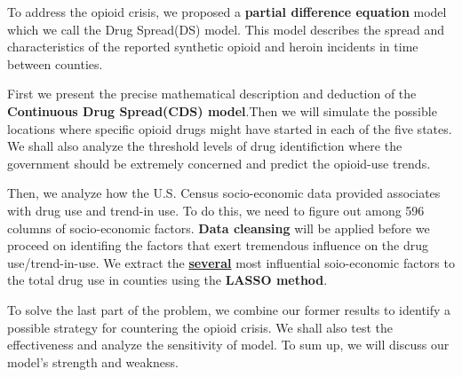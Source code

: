 To address the opioid crisis, we proposed a \textbf{partial difference equation} model which we call the Drug Spread(DS) model. This model describes the spread and characteristics of the reported synthetic opioid and heroin incidents in time between counties.

First we present the precise mathematical description and deduction of the \textbf{Continuous Drug Spread(CDS) model}.Then we will simulate the possible locations where specific opioid drugs might have started in each of the five states. We shall also analyze the threshold levels of drug identifiction where the government should be extremely concerned and predict the opioid-use trends.

Then, we analyze how the U.S. Census socio-economic data provided associates with drug use and trend-in use. To do this, we need to figure out among 596 columns of socio-economic factors. \textbf{Data cleansing} will be applied before we proceed on identifing the factors that exert tremendous influence on the drug use/trend-in-use. We extract the  \textbf{\underline{several}} most influential soio-economic factors to the total drug use in counties using the \textbf{LASSO method}. 

To solve the last part of the problem, we combine our former results to identify a possible strategy for countering the opioid crisis. We shall also test the effectiveness and analyze the sensitivity of model. To sum up, we will discuss our model's strength and weakness.





